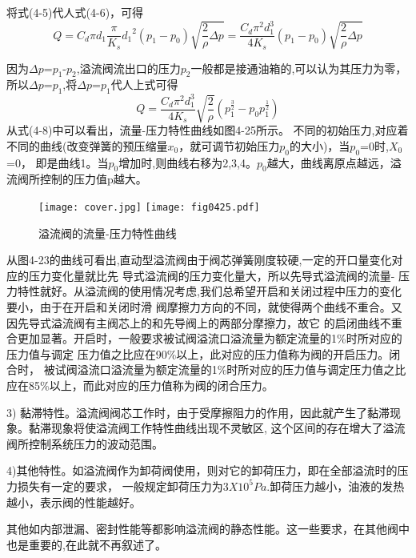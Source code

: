 \par 将式(4-5)代人式(4-6)，可得
\begin{equation}
   Q=C_d\pi d_1\frac{\pi}{K_s}{d_1}^2(p_1-p_0)\sqrt{\frac{2}{\rho}\Delta p}
=\frac{C_d\pi^2d_1^3}{4K_s}(p_1-p_0)\sqrt{\frac{2}{\rho}\Delta p} 
\end{equation}
\par 因为$\Delta p$=$p_1$-$p_2$,溢流阀流出口的压力$p_2$一般都是接通油箱的,可以认为其压力为零，
所以$\Delta p$=$p_1$,将$\Delta p$=$p_1$代人上式可得
\begin{equation}
   Q=\frac{C_d\pi^2d_1^3}{4K_s}\sqrt{\frac{2}{\rho}}(p_1^{\frac{3}{2}}-p_0p_1^\frac{1}{2})
\end{equation}
\qquad  从式(4-8)中可以看出，流量-压力特性曲线如图4-25所示。
不同的初始压力,对应着不同的曲线(改变弹簧的预压缩量$x_0$，就可调节初始压力$p_0$的大小)，当$p_0$=0时,$X_0$=0，
即是曲线1。当$p_0$增加时,则曲线右移为2,3,4。$p_0$越大，曲线离原点越远，溢流阀所控制的压力值p越大。

\begin{figure}
   \centering
    \ifOpenSource  
    \texttt{[image: cover.jpg]}
    \else
   \texttt{[image: fig0425.pdf]}
   \fi
   \caption{溢流阀的流量-压力特性曲线}
   \label{fig:fig0425}
   \end{figure}

从图4-23的曲线可看出,直动型溢流阀由于阀芯弹簧刚度较硬,一定的开口量变化对应的压力变化量就比先
导式溢流阀的压力变化量大，所以先导式溢流阀的流量-
压力特性就好。从溢流阀的使用情况考虑,我们总希望开启和关闭过程中压力的变化要小，由于在开启和关闭时滑
阀摩擦力方向的不同，就使得两个曲线不重合。又因先导式溢流阀有主阀芯上的和先导阀上的两部分摩擦力，故它
的启闭曲线不重合更加显著。开启时，一般要求被试阀溢流口溢流量为额定流量的1\%时所对应的压力值与调定
压力值之比应在90\%以上，此对应的压力值称为阀的开启压力。闭合时，
被试阀溢流口溢流量为额定流量的1\%时所对应的压力值与调定压力值之比应在85\%以上，而此对应的压力值称为阀的闭合压力。

3) 黏滞特性。溢流阀阀芯工作时，由于受摩擦阻力的作用，因此就产生了黏滞现象。黏滞现象将使溢流阀工作特性曲线出现不灵敏区,
这个区间的存在增大了溢流阀所控制系统压力的波动范围。

4)其他特性。如溢流阀作为卸荷阀使用，则对它的卸荷压力，即在全部溢流时的压力损失有一定的要求，
一般规定卸荷压力为$3X10^5 Pa$.卸荷压力越小，油液的发热越小，表示阀的性能越好。

其他如内部泄漏、密封性能等都影响溢流阀的静态性能。这一些要求，在其他阀中也是重要的,在此就不再叙述了。

